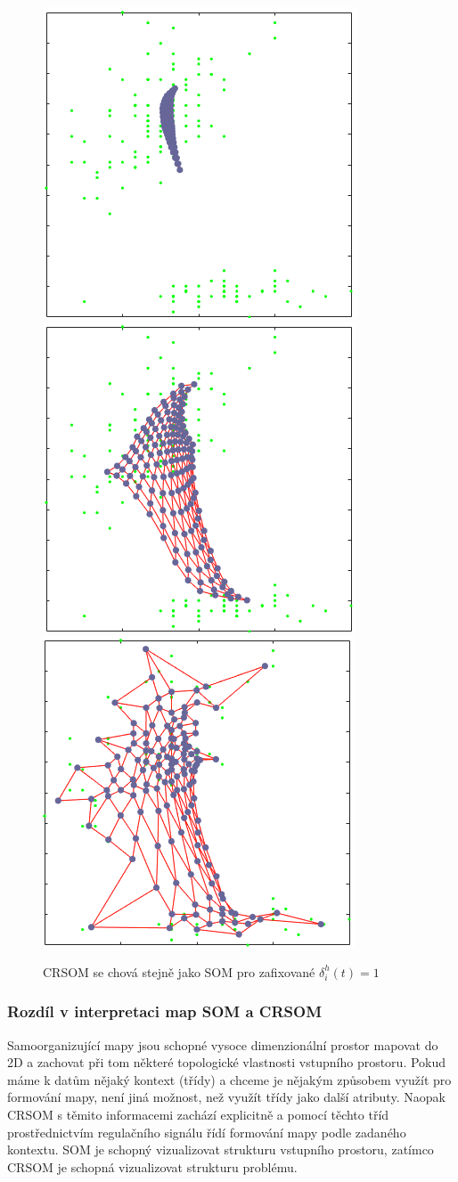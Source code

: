 \documentclass[thesis=M,czech]{FITthesis}[2012/06/26]
\begin{document}
\begin{figure}[htp]
    \centering
    
    \includegraphics[width=.32\textwidth]{s1.png}
    \includegraphics[width=.32\textwidth]{s2.png}
    \includegraphics[width=.32\textwidth]{s3.png}
    \caption{CRSOM se chová stejně jako SOM pro zafixované $ \delta_i^h(t) = 1 $ }
    \label{fig:delta_1}
\end{figure}


\subsubsection*{Rozdíl v interpretaci map SOM a CRSOM}
Samoorganizující mapy jsou schopné vysoce dimenzionální prostor mapovat do 2D a zachovat při tom některé topologické vlastnosti vstupního prostoru. Pokud máme k datům nějaký kontext (třídy) a chceme je nějakým způsobem využít pro formování mapy, není jiná možnost, než využít třídy jako další atributy. Naopak CRSOM s těmito informacemi zachází explicitně a pomocí těchto tříd prostřednictvím regulačního signálu řídí formování mapy podle zadaného kontextu. SOM je schopný vizualizovat strukturu vstupního prostoru, zatímco CRSOM je schopná vizualizovat strukturu problému\cite{hartono14}.
\end{document}
